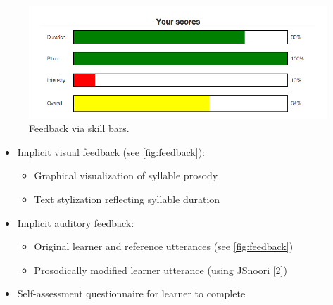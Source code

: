 \documentclass[a0,portrait]{a0poster}
\newcommand{\headingcolor}{\color{BannerSixColor}}
\def\Highlight#1{{\sffamily \headingcolor #1}}
\begin{document}
\begin{textblock}{7}
\begin{textblock}{7}
  \begin{figure}
  	\centering
	\includegraphics[width=.7\textwidth]{../../../img/screenshots/skillBars-balanced-pct}
	\caption{Feedback via skill bars.}
  \end{figure}
  
  \begin{itemize}
  \item{\Highlight{Implicit visual feedback} (see \cref{fig:feedback}): 
	  	\begin{itemize}
	  	\item{Graphical visualization of syllable prosody}
	  	\item{Text stylization reflecting syllable duration}
	  	\end{itemize}
	}
  \item{\Highlight{Implicit auditory feedback}:
		\begin{itemize}
		\item{Original learner and reference utterances (see \cref{fig:feedback})}
		\item{Prosodically modified learner utterance (using JSnoori [2])}
		\end{itemize}
  	}
  \item{\Highlight{Self-assessment} questionnaire for learner to complete %
  }
  \end{itemize}




\end{textblock}
  
  \end{textblock}
  
  
  
\end{document}
